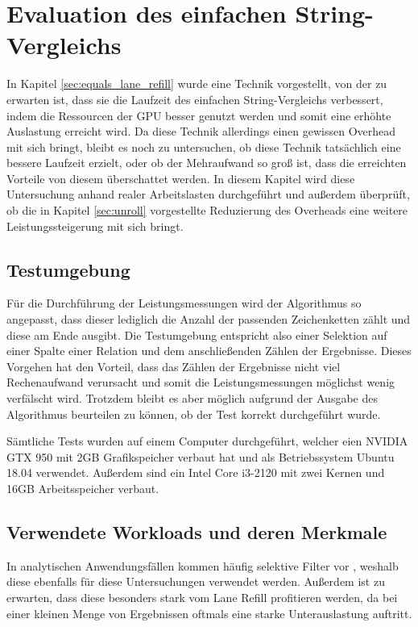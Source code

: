 \chapter{Evaluation des einfachen String-Vergleichs}
\label{sec:equals_evaluation}

In Kapitel \ref{sec:equals_lane_refill} wurde eine Technik vorgestellt, von der zu erwarten ist, dass sie die Laufzeit des einfachen String-Vergleichs verbessert, indem die Ressourcen der GPU besser genutzt werden und somit eine erhöhte Auslastung erreicht wird.
Da diese Technik allerdings einen gewissen Overhead mit sich bringt, bleibt es noch zu untersuchen, ob diese Technik tatsächlich eine bessere Laufzeit erzielt, oder ob der Mehraufwand so groß ist, dass die erreichten Vorteile von diesem überschattet werden.
In diesem Kapitel wird diese Untersuchung anhand realer Arbeitslasten durchgeführt und außerdem überprüft, ob die in Kapitel \ref{sec:unroll} vorgestellte Reduzierung des Overheads eine weitere Leistungssteigerung mit sich bringt.

\section{Testumgebung}
\label{sec:equals_testumgebung}

Für die Durchführung der Leistungsmessungen wird der Algorithmus so angepasst, dass dieser lediglich die Anzahl der passenden Zeichenketten zählt und diese am Ende ausgibt.
Die Testumgebung entspricht also einer Selektion auf einer Spalte einer Relation und dem anschließenden Zählen der Ergebnisse.
Dieses Vorgehen hat den Vorteil, dass das Zählen der Ergebnisse nicht viel Rechenaufwand verursacht und somit die Leistungsmessungen möglichst wenig verfälscht wird.
Trotzdem bleibt es aber möglich aufgrund der Ausgabe des Algorithmus beurteilen zu können, ob der Test korrekt durchgeführt wurde.

Sämtliche Tests wurden auf einem Computer durchgeführt, welcher eien NVIDIA GTX 950 mit 2GB Grafikspeicher verbaut hat und als Betriebssystem Ubuntu 18.04 verwendet.
Außerdem sind ein Intel Core i3-2120 mit zwei Kernen und 16GB Arbeitsspeicher verbaut.

\section{Verwendete Workloads und deren Merkmale}
\label{sec:equals_evaluation_workloads}

In analytischen Anwendungsfällen kommen häufig selektive Filter vor \cite{Boncz2013}, weshalb diese ebenfalls für diese Untersuchungen verwendet werden.
Außerdem ist zu erwarten, dass diese besonders stark vom Lane Refill profitieren werden, da bei einer kleinen Menge von Ergebnissen oftmals eine starke Unterauslastung auftritt.

